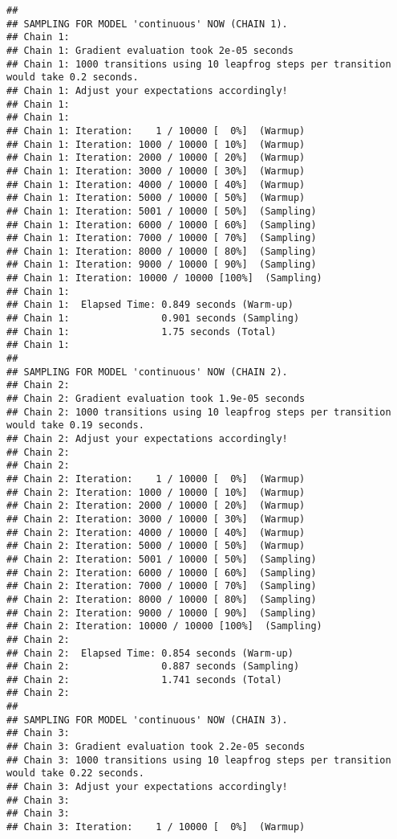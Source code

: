 \documentclass[
]{article}
\begin{document}
\begin{verbatim}
## 
## SAMPLING FOR MODEL 'continuous' NOW (CHAIN 1).
## Chain 1: 
## Chain 1: Gradient evaluation took 2e-05 seconds
## Chain 1: 1000 transitions using 10 leapfrog steps per transition would take 0.2 seconds.
## Chain 1: Adjust your expectations accordingly!
## Chain 1: 
## Chain 1: 
## Chain 1: Iteration:    1 / 10000 [  0%]  (Warmup)
## Chain 1: Iteration: 1000 / 10000 [ 10%]  (Warmup)
## Chain 1: Iteration: 2000 / 10000 [ 20%]  (Warmup)
## Chain 1: Iteration: 3000 / 10000 [ 30%]  (Warmup)
## Chain 1: Iteration: 4000 / 10000 [ 40%]  (Warmup)
## Chain 1: Iteration: 5000 / 10000 [ 50%]  (Warmup)
## Chain 1: Iteration: 5001 / 10000 [ 50%]  (Sampling)
## Chain 1: Iteration: 6000 / 10000 [ 60%]  (Sampling)
## Chain 1: Iteration: 7000 / 10000 [ 70%]  (Sampling)
## Chain 1: Iteration: 8000 / 10000 [ 80%]  (Sampling)
## Chain 1: Iteration: 9000 / 10000 [ 90%]  (Sampling)
## Chain 1: Iteration: 10000 / 10000 [100%]  (Sampling)
## Chain 1: 
## Chain 1:  Elapsed Time: 0.849 seconds (Warm-up)
## Chain 1:                0.901 seconds (Sampling)
## Chain 1:                1.75 seconds (Total)
## Chain 1: 
## 
## SAMPLING FOR MODEL 'continuous' NOW (CHAIN 2).
## Chain 2: 
## Chain 2: Gradient evaluation took 1.9e-05 seconds
## Chain 2: 1000 transitions using 10 leapfrog steps per transition would take 0.19 seconds.
## Chain 2: Adjust your expectations accordingly!
## Chain 2: 
## Chain 2: 
## Chain 2: Iteration:    1 / 10000 [  0%]  (Warmup)
## Chain 2: Iteration: 1000 / 10000 [ 10%]  (Warmup)
## Chain 2: Iteration: 2000 / 10000 [ 20%]  (Warmup)
## Chain 2: Iteration: 3000 / 10000 [ 30%]  (Warmup)
## Chain 2: Iteration: 4000 / 10000 [ 40%]  (Warmup)
## Chain 2: Iteration: 5000 / 10000 [ 50%]  (Warmup)
## Chain 2: Iteration: 5001 / 10000 [ 50%]  (Sampling)
## Chain 2: Iteration: 6000 / 10000 [ 60%]  (Sampling)
## Chain 2: Iteration: 7000 / 10000 [ 70%]  (Sampling)
## Chain 2: Iteration: 8000 / 10000 [ 80%]  (Sampling)
## Chain 2: Iteration: 9000 / 10000 [ 90%]  (Sampling)
## Chain 2: Iteration: 10000 / 10000 [100%]  (Sampling)
## Chain 2: 
## Chain 2:  Elapsed Time: 0.854 seconds (Warm-up)
## Chain 2:                0.887 seconds (Sampling)
## Chain 2:                1.741 seconds (Total)
## Chain 2: 
## 
## SAMPLING FOR MODEL 'continuous' NOW (CHAIN 3).
## Chain 3: 
## Chain 3: Gradient evaluation took 2.2e-05 seconds
## Chain 3: 1000 transitions using 10 leapfrog steps per transition would take 0.22 seconds.
## Chain 3: Adjust your expectations accordingly!
## Chain 3: 
## Chain 3: 
## Chain 3: Iteration:    1 / 10000 [  0%]  (Warmup)

\end{verbatim}
\end{document}
